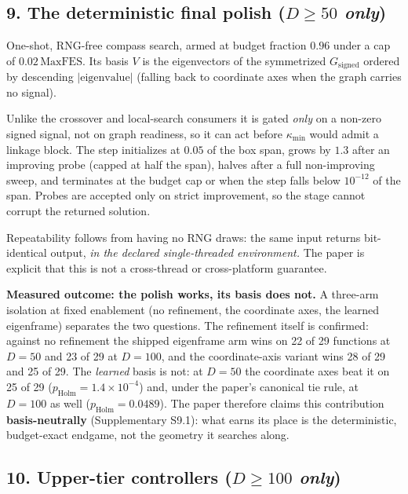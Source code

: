 \documentclass[11pt,a4paper]{article}
\newcommand{\hl}[1]{\textbf{#1}}
\begin{document}
\subsection{9. The deterministic final polish (\emph{$D\geq50$ only})}

One-shot, RNG-free compass search, armed at budget fraction $0.96$ under a cap
of $0.02\,\mathrm{MaxFES}$. Its basis $V$ is the eigenvectors of the
symmetrized $G_{\mathrm{signed}}$ ordered by descending $|\text{eigenvalue}|$
(falling back to coordinate axes when the graph carries no signal).

Unlike the crossover and local-search consumers it is gated \emph{only} on a
non-zero signed signal, not on graph readiness, so it can act before
$\kappa_{\min}$ would admit a linkage block. The step initializes at $0.05$ of
the box span, grows by $1.3$ after an improving probe (capped at half the
span), halves after a full non-improving sweep, and terminates at the budget
cap or when the step falls below $10^{-12}$ of the span. Probes are accepted
only on strict improvement, so the stage cannot corrupt the returned solution.

Repeatability follows from having no RNG draws: the same input returns
bit-identical output, \emph{in the declared single-threaded environment.}
The paper is explicit that this is not a cross-thread or cross-platform
guarantee.

\hl{Measured outcome: the polish works, its basis does not.} A three-arm
isolation at fixed enablement (no refinement, the coordinate axes, the
learned eigenframe) separates the two questions. The refinement itself is
confirmed: against no refinement the shipped eigenframe arm wins on 22 of 29
functions at $D{=}50$ and 23 of 29 at $D{=}100$, and the coordinate-axis
variant wins 28 of 29 and 25 of 29. The \emph{learned} basis is not: at
$D{=}50$ the coordinate axes beat it on 25 of 29
($p_{\mathrm{Holm}} = 1.4\times10^{-4}$) and, under the paper's canonical tie
rule, at $D{=}100$ as well ($p_{\mathrm{Holm}} = 0.0489$). The paper therefore
claims this contribution \hl{basis-neutrally}
(Supplementary S9.1): what earns its place is the deterministic,
budget-exact endgame, not the geometry it searches along.

\subsection{10. Upper-tier controllers (\emph{$D\geq100$ only})}
\end{document}
